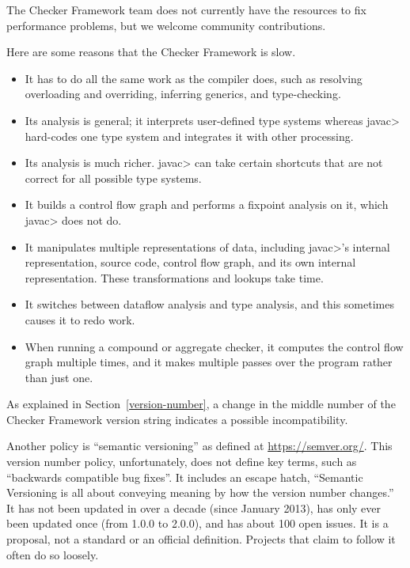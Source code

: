 The Checker Framework team does not currently have the resources to fix
performance problems, but we welcome community contributions.

Here are some reasons that the Checker Framework is slow.
\begin{itemize}
\item
  It has to do all the same work as the compiler does, such as resolving
  overloading and overriding, inferring generics, and type-checking.
\item
  Its analysis is general; it interprets user-defined type systems whereas
  \<javac> hard-codes one type system and integrates it with other processing.
\item
  Its analysis is much richer.  \<javac> can take certain shortcuts that
  are not correct for all possible type systems.
\item
  It builds a control flow graph and performs a fixpoint analysis on it,
  which \<javac> does not do.
\item
  It manipulates multiple representations of data, including \<javac>'s
  internal representation, source code, control flow graph, and its own
  internal representation.  These transformations and lookups take time.
\item
  It switches between dataflow analysis and type analysis, and this
  sometimes causes it to redo work.
\item
  When running a compound or aggregate checker, it computes the control
  flow graph multiple times, and it makes multiple passes over the program
  rather than just one.
\end{itemize}



As explained in Section~\ref{version-number}, a change in the middle number
of the Checker Framework version string indicates a possible
incompatibility.

Another policy is ``semantic versioning'' as defined at
\url{https://semver.org/}.  This version number policy, unfortunately,
does not define key terms, such as ``backwards compatible bug fixes''.  It
includes an
escape hatch, ``Semantic Versioning is all about conveying meaning by how
the version number changes.''  It has not been updated in over a decade
(since January 2013), has only ever been updated once (from
1.0.0 to 2.0.0), and has
about 100 open issues.
It is a proposal, not a standard or an official definition.
Projects that claim to follow it often do so loosely.

